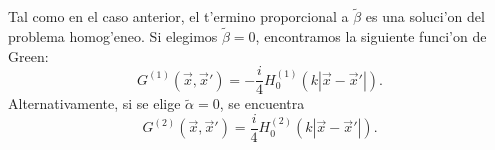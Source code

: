 Tal como en el caso anterior, el t'ermino proporcional a $\tilde\beta$ es una soluci'on del problema homog'eneo. Si elegimos $\tilde\beta=0$, encontramos la siguiente funci'on de Green:
\begin{equation}
\boxed{G^{(1)}(\vec{x},\vec{x}') = -\frac{i}{4}H_0^{(1)}(k|\vec{x}-\vec{x}'|).}
\end{equation}
Alternativamente, si se elige $\tilde\alpha=0$, se encuentra
\begin{equation}
G^{(2)}(\vec{x},\vec{x}') = \frac{i}{4}H_0^{(2)}(k|\vec{x}-\vec{x}'|).
\end{equation}